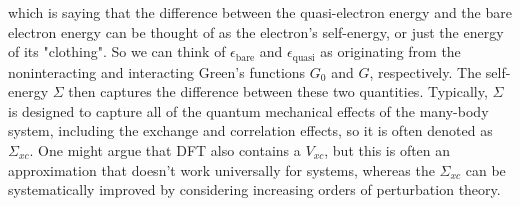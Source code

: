 \documentclass[12pt]{article}
\begin{document}
which is saying that the difference between the quasi-electron energy and the bare electron energy can be thought of as the electron's self-energy, or just the energy of its "clothing". So we can think of $\epsilon_{\text{bare}}$ and $\epsilon_{\text{quasi}}$ as originating from the noninteracting and interacting Green's functions $G_0$ and $G$, respectively. The self-energy $\Sigma$ then captures the difference between these two quantities. Typically, $\Sigma$ is designed to capture all of the quantum mechanical effects of the many-body system, including the exchange and correlation effects, so it is often denoted as $\Sigma_{xc}$. One might argue that DFT also contains a $V_{xc}$, but this is often an approximation that doesn't work universally for systems, whereas the $\Sigma_{xc}$ can be systematically improved by considering increasing orders of perturbation theory.
\end{document}
